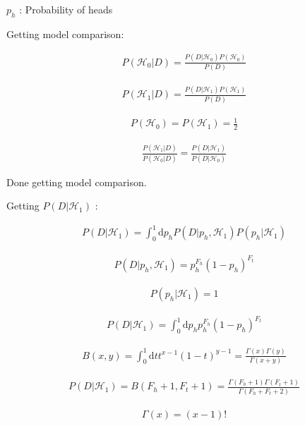 \documentclass[12pt]{article}
\begin{document}
$p_h$ : Probability of heads

Getting model comparison:

\begin{gather}
P(\mathcal{H}_0 | D) = \frac{P(D | \mathcal{H}_0)P(\mathcal{H}_0)}{P(D)}
\end{gather}

\begin{gather}
P(\mathcal{H}_1 | D) = \frac{P(D | \mathcal{H}_1)P(\mathcal{H}_1)}{P(D)}
\end{gather}

\begin{gather}
P(\mathcal{H}_0) = P(\mathcal{H}_1) = \frac{1}{2}
\end{gather}

\begin{gather}
\frac{P(\mathcal{H}_1 | D)}{P(\mathcal{H}_0 | D)} = \frac{P(D | \mathcal{H}_1)}{P(D | \mathcal{H}_0)}
\end{gather}

Done getting model comparison.

Getting $P(D|\mathcal{H}_1)$ :

\begin{gather}
P(D|\mathcal{H}_1) = \int_0^1 \! \mathrm{d}p_h P(D|p_h,\mathcal{H}_1)P(p_h|\mathcal{H}_1)
\end{gather}

\begin{gather}
P(D|p_h,\mathcal{H}_1) = p_h^{F_h}(1 - p_h)^{F_t}
\end{gather}

\begin{gather}
P(p_h|\mathcal{H}_1) = 1
\end{gather}

\begin{gather}
P(D|\mathcal{H}_1) = \int_0^1 \! \mathrm{d}p_h p_h^{F_h}(1 - p_h)^{F_t}
\end{gather}

\begin{gather}
B(x,y) = \int_0^1 \! \mathrm{d}t t^{x-1}(1-t)^{y-1} = \frac{\Gamma(x)\Gamma(y)}{\Gamma(x+y)}
\end{gather}

\begin{gather}
P(D|\mathcal{H}_1) = B(F_h+1,F_t+1) = \frac{\Gamma(F_h+1)\Gamma(F_t+1)}{\Gamma(F_h+F_t+2)}
\end{gather}

\begin{gather}
\Gamma(x) = (x-1)!
\end{gather}
\end{document}
